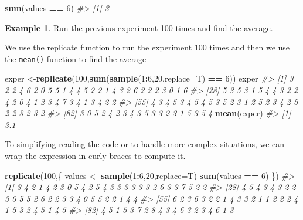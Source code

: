 \documentclass[
]{book}
\newenvironment{Shaded}{\begin{snugshade}}{\end{snugshade}}
\newcommand{\AttributeTok}[1]{\textcolor[rgb]{0.13,0.29,0.53}{#1}}
\newcommand{\CommentTok}[1]{\textcolor[rgb]{0.56,0.35,0.01}{\textit{#1}}}
\newcommand{\DecValTok}[1]{\textcolor[rgb]{0.00,0.00,0.81}{#1}}
\newcommand{\FunctionTok}[1]{\textcolor[rgb]{0.13,0.29,0.53}{\textbf{#1}}}
\newcommand{\NormalTok}[1]{#1}
\newcommand{\OtherTok}[1]{\textcolor[rgb]{0.56,0.35,0.01}{#1}}
\newcommand{\SpecialCharTok}[1]{\textcolor[rgb]{0.81,0.36,0.00}{\textbf{#1}}}
\theoremstyle{definition}
\theoremstyle{definition}
\newtheorem{example}{Example}[chapter]
\theoremstyle{definition}
\theoremstyle{definition}
\theoremstyle{remark}
\begin{document}
\begin{Shaded}
\begin{Highlighting}[]
\FunctionTok{sum}\NormalTok{(values }\SpecialCharTok{==} \DecValTok{6}\NormalTok{)}
\CommentTok{\#\textgreater{} [1] 3}
\end{Highlighting}
\end{Shaded}

\begin{example}
Run the previous experiment 100 times and find the average.
\end{example}

We use the replicate function to run the experiment 100 times and then we use the \texttt{mean()} function to find the average

\begin{Shaded}
\begin{Highlighting}[]
\NormalTok{exper }\OtherTok{\textless{}{-}}\FunctionTok{replicate}\NormalTok{(}\DecValTok{100}\NormalTok{,}\FunctionTok{sum}\NormalTok{(}\FunctionTok{sample}\NormalTok{(}\DecValTok{1}\SpecialCharTok{:}\DecValTok{6}\NormalTok{,}\DecValTok{20}\NormalTok{,}\AttributeTok{replace=}\NormalTok{T) }\SpecialCharTok{==} \DecValTok{6}\NormalTok{))}
\NormalTok{exper }
\CommentTok{\#\textgreater{}   [1] 3 2 2 4 6 2 0 5 5 1 4 4 5 2 2 1 4 3 2 6 2 2 2 3 0 1 6}
\CommentTok{\#\textgreater{}  [28] 5 3 5 3 1 5 4 4 3 2 2 4 2 0 4 1 2 3 4 7 3 4 1 3 4 2 2}
\CommentTok{\#\textgreater{}  [55] 4 3 4 5 3 4 5 4 5 3 5 2 3 1 2 5 2 3 4 2 5 2 2 3 2 3 2}
\CommentTok{\#\textgreater{}  [82] 3 0 5 2 4 2 3 4 3 5 3 3 2 3 1 5 3 5 4}
\FunctionTok{mean}\NormalTok{(exper)}
\CommentTok{\#\textgreater{} [1] 3.1}
\end{Highlighting}
\end{Shaded}

To simplifying reading the code or to handle more complex situations, we can wrap the expression in curly braces to compute it.

\begin{Shaded}
\begin{Highlighting}[]
\FunctionTok{replicate}\NormalTok{(}\DecValTok{100}\NormalTok{,\{}
\NormalTok{  values }\OtherTok{\textless{}{-}} \FunctionTok{sample}\NormalTok{(}\DecValTok{1}\SpecialCharTok{:}\DecValTok{6}\NormalTok{,}\DecValTok{20}\NormalTok{,}\AttributeTok{replace=}\NormalTok{T)}
  \FunctionTok{sum}\NormalTok{(values }\SpecialCharTok{==} \DecValTok{6}\NormalTok{)}
\NormalTok{\})}
\CommentTok{\#\textgreater{}   [1] 3 4 2 1 4 2 3 0 5 4 2 5 4 3 3 3 3 3 3 2 6 3 3 7 5 2 2}
\CommentTok{\#\textgreater{}  [28] 4 5 4 3 4 3 2 2 3 0 5 5 2 6 2 2 3 3 4 0 5 5 2 2 1 4 4}
\CommentTok{\#\textgreater{}  [55] 6 2 3 6 3 2 2 1 4 3 3 2 1 1 2 2 2 4 1 5 3 2 4 5 1 4 5}
\CommentTok{\#\textgreater{}  [82] 4 5 1 5 3 7 2 8 4 3 4 6 3 2 3 4 6 1 3}
\end{Highlighting}
\end{Shaded}
\end{document}
